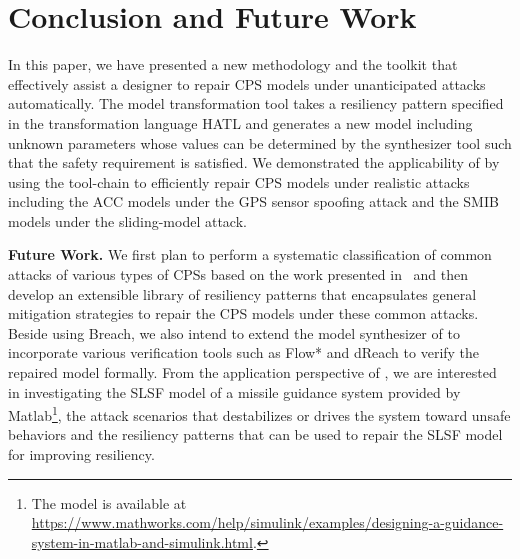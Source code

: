 \section{Conclusion and Future Work}
%
In this paper, we have presented a new methodology and the toolkit \toolreaffirm that effectively assist a designer to repair CPS models under unanticipated attacks automatically. 
%
The model transformation tool takes a resiliency pattern specified in the transformation language HATL and generates a new model including unknown parameters whose values can be determined by the synthesizer tool such that the safety requirement is satisfied.
%
We demonstrated the applicability of \toolreaffirm by using the tool-chain to efficiently repair CPS models under realistic attacks including the ACC models under the GPS sensor spoofing attack and the SMIB models under the sliding-model attack.

\vspace{0.5em}
\noindent
{\bf Future Work.} We first plan to perform a systematic classification of common attacks of various types of CPSs based on the work presented in~\cite{humayed2017cyber} and then develop an extensible library of resiliency patterns that encapsulates general mitigation strategies to repair the CPS models under these common attacks.
%
Beside using Breach, we also intend to extend the model synthesizer of \toolreaffirm to incorporate various verification tools such as Flow* and dReach to verify the repaired model formally.
%
From the application perspective of \toolreaffirm, we are interested in investigating the SLSF model of a missile guidance system provided by Matlab\footnote{The model is available at \url{https://www.mathworks.com/help/simulink/examples/designing-a-guidance-system-in-matlab-and-simulink.html}.}, the attack scenarios that destabilizes or drives the system toward unsafe behaviors and the resiliency patterns that can be used to repair the SLSF model for improving resiliency.

